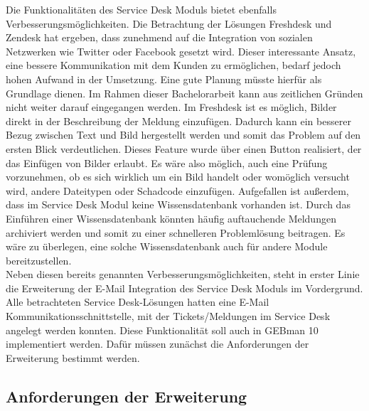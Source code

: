 \noindent
Die Funktionalitäten des Service Desk Moduls bietet ebenfalls Verbesserungsmöglichkeiten. Die Betrachtung der Lösungen Freshdesk und Zendesk hat ergeben, dass zunehmend auf die Integration von sozialen Netzwerken wie Twitter oder Facebook gesetzt wird. Dieser interessante Ansatz, eine bessere Kommunikation mit dem Kunden zu ermöglichen, bedarf jedoch hohen Aufwand in der Umsetzung. Eine gute Planung müsste hierfür als Grundlage dienen. Im Rahmen dieser Bachelorarbeit kann aus zeitlichen Gründen nicht weiter darauf eingegangen werden.\newline 
Im Freshdesk ist es möglich, Bilder direkt in der Beschreibung der Meldung einzufügen. Dadurch kann ein besserer Bezug zwischen Text und Bild hergestellt werden und somit das Problem auf den ersten Blick verdeutlichen. Dieses Feature wurde über einen Button realisiert, der das Einfügen von Bilder erlaubt. Es wäre also möglich, auch eine Prüfung vorzunehmen, ob es sich wirklich um ein Bild handelt oder womöglich versucht wird, andere Dateitypen oder Schadcode einzufügen.\newline
Aufgefallen ist außerdem, dass im Service Desk Modul keine Wissensdatenbank vorhanden ist. Durch das Einführen einer Wissensdatenbank könnten häufig auftauchende Meldungen archiviert werden und somit zu einer schnelleren Problemlösung beitragen. Es wäre zu überlegen, eine solche Wissensdatenbank auch für andere Module bereitzustellen. \\

\noindent
Neben diesen bereits genannten Verbesserungsmöglichkeiten, steht in erster Linie die Erweiterung der E-Mail Integration des Service Desk Moduls im Vordergrund. Alle betrachteten Service Desk-Lösungen hatten eine E-Mail Kommunikationsschnittstelle, mit der Tickets/Meldungen im Service Desk angelegt werden konnten. Diese Funktionalität soll auch in GEBman 10 implementiert werden. Dafür müssen zunächst die Anforderungen der Erweiterung bestimmt werden.

\subsection{Anforderungen der Erweiterung}


